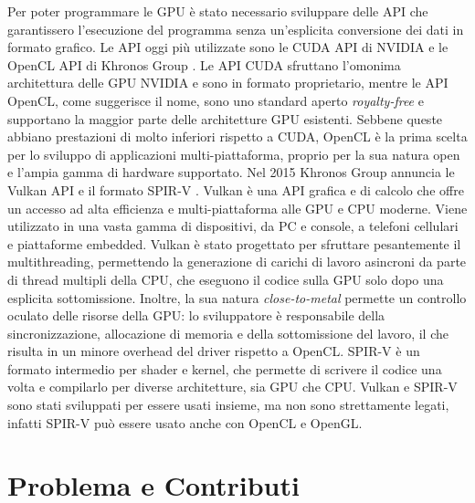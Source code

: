 Per poter programmare le \gls{GPU} è stato necessario sviluppare delle \gls{API} che garantissero l'esecuzione del programma senza un'esplicita conversione dei dati in formato grafico. Le \gls{API} oggi più utilizzate sono le \gls{CUDA} \gls{API} di NVIDIA \cite[]{NVIDIA:CUDA} e le OpenCL \gls{API} di Khronos Group \cite[]{KG:OpenCL}. Le \gls{API} \gls{CUDA} sfruttano l'omonima architettura delle \gls{GPU} NVIDIA e sono in formato proprietario, mentre le \gls{API} OpenCL, come suggerisce il nome, sono uno standard aperto \textit{royalty-free} e supportano la maggior parte delle architetture \gls{GPU} esistenti. Sebbene queste abbiano prestazioni di molto inferiori rispetto a CUDA, OpenCL è la prima scelta per lo sviluppo di applicazioni multi-piattaforma, proprio per la sua natura open e l'ampia gamma di hardware supportato. Nel 2015 Khronos Group annuncia le Vulkan \gls{API} \cite[]{KG:Vulkan} e il formato \gls{SPIR-V} \cite[]{KG:SPIR-V}. Vulkan è una \gls{API} grafica e di calcolo che offre un accesso ad alta efficienza e multi-piattaforma alle \gls{GPU} e \gls{CPU} moderne. Viene utilizzato in una vasta gamma di dispositivi, da PC e console, a telefoni cellulari e piattaforme embedded. Vulkan è stato progettato per sfruttare pesantemente il multithreading, permettendo la generazione di carichi di lavoro asincroni da parte di thread multipli della \gls{CPU}, che eseguono il codice sulla \gls{GPU} solo dopo una esplicita sottomissione. Inoltre, la sua natura \textit{close-to-metal} permette un controllo oculato delle risorse della \gls{GPU}: lo sviluppatore è responsabile della sincronizzazione, allocazione di memoria e della sottomissione del lavoro, il che risulta in un minore overhead del driver rispetto a OpenCL. \gls{SPIR-V} è un formato intermedio per shader e kernel, che permette di scrivere il codice una volta e compilarlo per diverse architetture, sia \gls{GPU} che \gls{CPU}. Vulkan e \gls{SPIR-V} sono stati sviluppati per essere usati insieme, ma non sono strettamente legati, infatti \gls{SPIR-V} può essere usato anche con OpenCL e OpenGL.

\section[Problema e Contributi]{Problema e Contributi}

